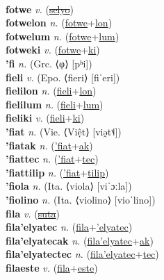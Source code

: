  \label{fotluki} \\
\textbf{fotwe} \textit{v.} (\hyperref[selyo]{\sout{selyo}})
 \label{fotwe} \\
\textbf{fotwelon} \textit{n.} (\hyperref[fotwe]{fotwe}+\hyperref[lon]{lon})
 \label{fotwelon} \\
\textbf{fotwelum} \textit{n.} (\hyperref[fotwe]{fotwe}+\hyperref[lum]{lum})
 \label{fotwelum} \\
\textbf{fotweki} \textit{v.} (\hyperref[fotwe]{fotwe}+\hyperref[ki]{ki})
 \label{fotweki} \\
\textbf{'fi} \textit{n.} (Grc. ⟨φ⟩ [pʰi])
 \label{'fi} \\
\textbf{fieli} \textit{v.} (Epo. ⟨fieri⟩ [fiˈeri])
 \label{fieli} \\
\textbf{fielilon} \textit{n.} (\hyperref[fieli]{fieli}+\hyperref[lon]{lon})
 \label{fielilon} \\
\textbf{fielilum} \textit{n.} (\hyperref[fieli]{fieli}+\hyperref[lum]{lum})
 \label{fielilum} \\
\textbf{fieliki} \textit{v.} (\hyperref[fieli]{fieli}+\hyperref[ki]{ki})
 \label{fieliki} \\
\textbf{'fiat} \textit{n.} (Vie. ⟨Việt⟩ [viə̯t˦˨])
 \label{'fiat} \\
\textbf{'fiatak} \textit{n.} (\hyperref['fiat]{'fiat}+\hyperref[ak]{ak})
 \label{'fiatak} \\
\textbf{'fiattec} \textit{n.} (\hyperref['fiat]{'fiat}+\hyperref[tec]{tec})
 \label{'fiattec} \\
\textbf{'fiattilip} \textit{n.} (\hyperref['fiat]{'fiat}+\hyperref[tilip]{tilip})
 \label{'fiattilip} \\
\textbf{'fiola} \textit{n.} (Ita. ⟨viola⟩ [viˈɔːla])
 \label{'fiola} \\
\textbf{'fiolino} \textit{n.} (Ita. ⟨violino⟩ [vioˈlino])
 \label{'fiolino} \\
\textbf{fila} \textit{v.} (\hyperref[suta]{\sout{suta}})
 \label{fila} \\
\textbf{fila'elyatec} \textit{n.} (\hyperref[fila]{fila}+\hyperref['elyatec]{'elyatec})
 \label{fila'elyatec} \\
\textbf{fila'elyatecak} \textit{n.} (\hyperref[fila'elyatec]{fila'elyatec}+\hyperref[ak]{ak})
 \label{fila'elyatecak} \\
\textbf{fila'elyatectec} \textit{n.} (\hyperref[fila'elyatec]{fila'elyatec}+\hyperref[tec]{tec})
 \label{fila'elyatectec} \\
\textbf{filaeste} \textit{v.} (\hyperref[fila]{fila}+\hyperref[este]{este})
